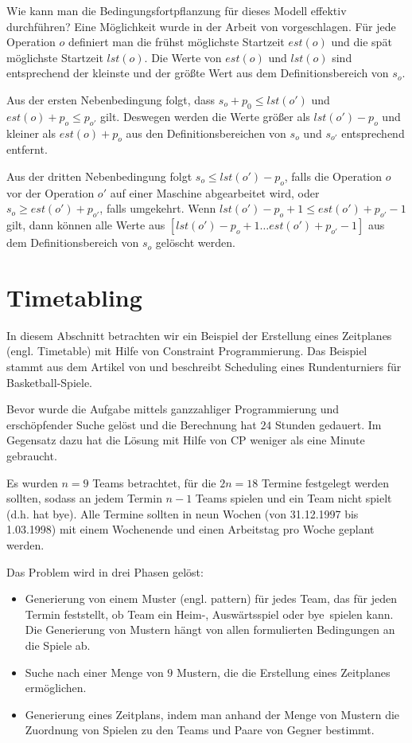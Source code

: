 Wie kann man die Bedingungsfortpflanzung für dieses Modell effektiv durchführen? Eine Möglichkeit wurde in der Arbeit von \cite{Nuijten} vorgeschlagen. Für jede Operation $o$ definiert man die frühst möglichste Startzeit $est(o)$ und die spät möglichste Startzeit $lst(o)$. Die Werte von $est(o)$ und $lst(o)$ sind entsprechend der kleinste und der größte Wert aus dem Definitionsbereich von $s_o$.

Aus der ersten Nebenbedingung folgt, dass $s_o+p_0\le lst(o')$ und $est(o)+p_o\le p_{o'}$ gilt. Deswegen werden die Werte größer als $lst(o')-p_o$ und kleiner als  $est(o)+p_o$ aus den Definitionsbereichen von $s_o$ und $s_{o'}$ entsprechend  entfernt.

Aus der dritten Nebenbedingung folgt $s_o\le lst(o') - p_o$, falls die Operation $o$ vor der Operation $o'$ auf einer Maschine abgearbeitet wird, oder $s_o \ge est(o') + p_{o'}$, falls umgekehrt. Wenn $lst(o') - p_o + 1 \le est(o') + p_{o'} -1$ gilt, dann können alle Werte aus $[lst(o') - p_o + 1 \dots est(o') + p_{o'} -1]$ aus dem Definitionsbereich von $s_o$ gelöscht werden.



\section{Timetabling}

In diesem Abschnitt betrachten wir ein Beispiel der Erstellung eines Zeitplanes (engl. Timetable) mit Hilfe von Constraint Programmierung. Das Beispiel stammt aus dem Artikel von \cite{Timetabling} und beschreibt Scheduling eines Rundenturniers für Basketball-Spiele.

Bevor \cite{Timetabling} wurde die Aufgabe mittels ganzzahliger Programmierung und erschöpfender Suche \citep[siehe][]{Timetabling_Trick} gelöst und die Berechnung hat $24$ Stunden gedauert. Im Gegensatz dazu hat die Lösung mit Hilfe von CP weniger als eine Minute gebraucht.

Es wurden $n=9$ Teams betrachtet, für die $2n=18$ Termine festgelegt werden sollten, sodass an jedem Termin $n-1$ Teams spielen und ein Team nicht spielt (d.h. hat \glqq bye\grqq). Alle Termine sollten in neun Wochen (von 31.12.1997 bis 1.03.1998) mit einem Wochenende und einen Arbeitstag pro Woche geplant werden.

Das Problem wird in drei Phasen gelöst: \begin{itemize}
\setlength{\itemsep}{0pt}
\item Generierung von einem Muster (engl. pattern) für jedes Team, das für jeden Termin feststellt, ob Team ein Heim-, Auswärtsspiel oder \glqq bye\grqq\ spielen kann. Die Generierung von Mustern hängt von allen formulierten Bedingungen an die Spiele ab. 
\item Suche nach einer Menge von $9$ Mustern, die die Erstellung eines Zeitplanes ermöglichen.
\item Generierung eines Zeitplans, indem man anhand der Menge von Mustern die Zuordnung von Spielen zu den Teams und Paare von Gegner bestimmt.
\end{itemize}


